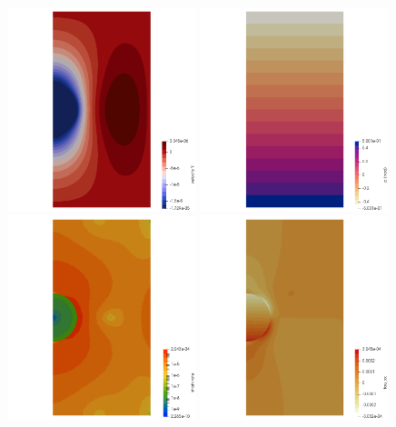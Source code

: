 \begin{center}
\includegraphics[width=5.5cm]{python_codes/fieldstone_92/results/v}
\includegraphics[width=5.5cm]{python_codes/fieldstone_92/results/press}\\
\includegraphics[width=5.5cm]{python_codes/fieldstone_92/results/sr}
\includegraphics[width=5.5cm]{python_codes/fieldstone_92/results/tauxx}

\end{center}
